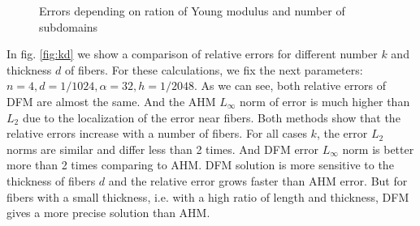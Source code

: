 \documentclass[a4paper]{jpconf}
\begin{document}
\begin{figure}[H]
    \centering
    \hfill
    \caption{Errors depending on ration of Young modulus and number of subdomains}
    \label{fig:fn}
\end{figure}

In fig. \ref{fig:kd} we show a comparison of relative errors for different number $k$ and thickness $d$ of fibers. For these calculations, we fix the next parameters: $n = 4, d = 1/1024, \alpha = 32, h = 1/2048$.
As we can see, both relative errors of DFM are almost the same. And the AHM $L_\infty$ norm of error is much higher than $L_2$ due to the localization of the error near fibers. Both methods show that the relative errors increase with a number of fibers. For all cases $k$, the error $L_2$ norms are similar and differ less than 2 times. And DFM error $L_\infty$ norm is better more than 2 times comparing to AHM.
DFM solution is more sensitive to the thickness of fibers $d$ and the relative error grows faster than AHM error. But for fibers with a small thickness, i.e. with a high ratio of length and thickness, DFM gives a more precise solution than AHM.
\end{document}
